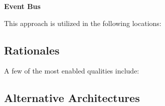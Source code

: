 \textbf{Event Bus}

This approach is utilized in the following locations:
\begin{itemize}
\end{itemize}


\subsection{Rationales}
A few of the most enabled qualities include:

\begin{itemize}
\end{itemize}

\subsection{Alternative Architectures}

